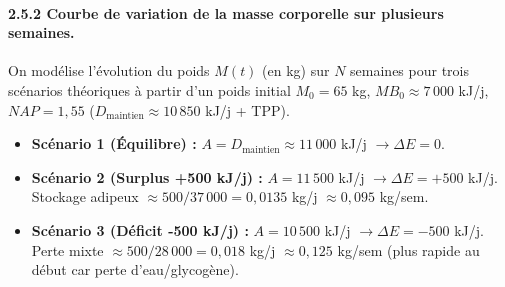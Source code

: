\documentclass[11pt]{article}
\begin{document}
\paragraph{2.5.2 Courbe de variation de la masse corporelle sur plusieurs semaines.}
On modélise l'évolution du poids $M(t)$ (en kg) sur $N$ semaines pour trois scénarios théoriques à partir d'un poids initial $M_0 = 65$ kg, $MB_0 \approx 7\,000$ kJ/j, $NAP = 1,55$ ($D_{\text{maintien}} \approx 10\,850$ kJ/j + TPP).
\begin{itemize}
    \item \textbf{Scénario 1 (Équilibre) :} $A = D_{\text{maintien}} \approx 11\,000$ kJ/j $\rightarrow \Delta E = 0$.
    \item \textbf{Scénario 2 (Surplus +500 kJ/j) :} $A = 11\,500$ kJ/j $\rightarrow \Delta E = +500$ kJ/j. Stockage adipeux $\approx 500/37\,000 = 0,0135$ kg/j $\approx 0,095$ kg/sem.
    \item \textbf{Scénario 3 (Déficit -500 kJ/j) :} $A = 10\,500$ kJ/j $\rightarrow \Delta E = -500$ kJ/j. Perte mixte $\approx 500/28\,000 = 0,018$ kg/j $\approx 0,125$ kg/sem (plus rapide au début car perte d'eau/glycogène).
\end{itemize}
\end{document}
